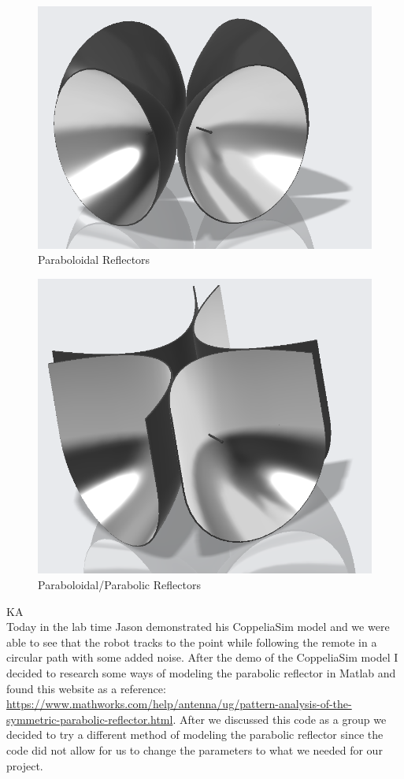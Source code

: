 \documentclass[fontsize=11pt, %
                             paper=letter, %
                             openany, %
                             captions=tableheading,
                             index=totoc,
                             hyperref]{labbook}
\begin{document}
\begin{addmargin}[0cm]{0cm}
\begin{figure}[h!]
    \centering
    \includegraphics[width=4.5in]{figs/img/paraboloidalReflector.png}
    \caption{Paraboloidal Reflectors}
    \label{fig:paraboloidalReflectors}
\end{figure}

\begin{figure}[h!]
    \centering
    \includegraphics[width=4.5in]{figs/img/parabolicReflector.png}
    \caption{Paraboloidal/Parabolic Reflectors}
    \label{fig:paraboloidalParabolicReflectors}
\end{figure}

\vspace*{12pt}
\vspace*{12pt}
KA\\
Today in the lab time Jason demonstrated his CoppeliaSim model and we were able to see that the robot tracks to the point while following the remote in a circular path with some added noise. After the demo of the CoppeliaSim model I decided to research some ways of modeling the parabolic reflector in Matlab and found this website as a reference: \href{https://www.mathworks.com/help/antenna/ug/pattern-analysis-of-the-symmetric-parabolic-reflector.html}{https://www.mathworks.com/help/antenna/ug/pattern-analysis-of-the-symmetric-parabolic-reflector.html}. After we discussed this code as a group we decided to try a different method of modeling the parabolic reflector since the code did not allow for us to change the parameters to what we needed for our project.


\end{addmargin}
\end{document}
